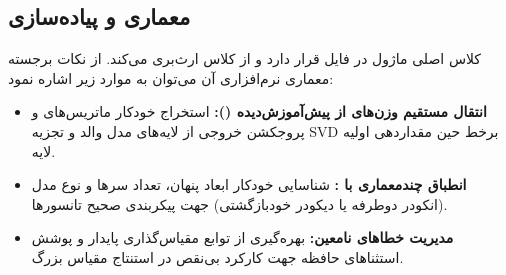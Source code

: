 \subsection{معماری و پیاده‌سازی}
کلاس اصلی ماژول  در فایل  قرار دارد و از کلاس  ارث‌بری می‌کند. از نکات برجسته معماری نرم‌افزاری آن می‌توان به موارد زیر اشاره نمود:
\begin{itemize}
    \item \textbf{انتقال مستقیم وزن‌های از پیش‌آموزش‌دیده ():} استخراج خودکار ماتریس‌های  و پروجکشن خروجی از لایه‌های مدل والد و تجزیه SVD برخط حین مقداردهی اولیه لایه.
    \item \textbf{انطباق چندمعماری با :} شناسایی خودکار ابعاد پنهان، تعداد سرها و نوع مدل (انکودر دوطرفه یا دیکودر خودبازگشتی) جهت پیکربندی صحیح تانسورها.
    \item \textbf{مدیریت خطاهای نامعین:} بهره‌گیری از توابع مقیاس‌گذاری پایدار و پوشش استثناهای حافظه جهت کارکرد بی‌نقص در استنتاج مقیاس بزرگ.
\end{itemize}
